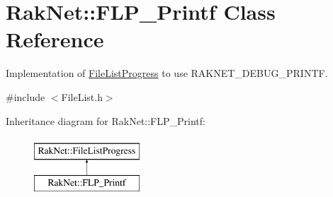 \hypertarget{class_rak_net_1_1_f_l_p___printf}{\section{Rak\-Net\-:\-:F\-L\-P\-\_\-\-Printf Class Reference}
\label{class_rak_net_1_1_f_l_p___printf}
}


Implementation of \hyperlink{class_rak_net_1_1_file_list_progress}{File\-List\-Progress} to use R\-A\-K\-N\-E\-T\-\_\-\-D\-E\-B\-U\-G\-\_\-\-P\-R\-I\-N\-T\-F.  




{\ttfamily \#include $<$File\-List.\-h$>$}

Inheritance diagram for Rak\-Net\-:\-:F\-L\-P\-\_\-\-Printf\-:\begin{figure}[H]
\begin{center}
\leavevmode
\includegraphics[height=2.000000cm]{class_rak_net_1_1_f_l_p___printf}
\end{center}
\end{figure}
